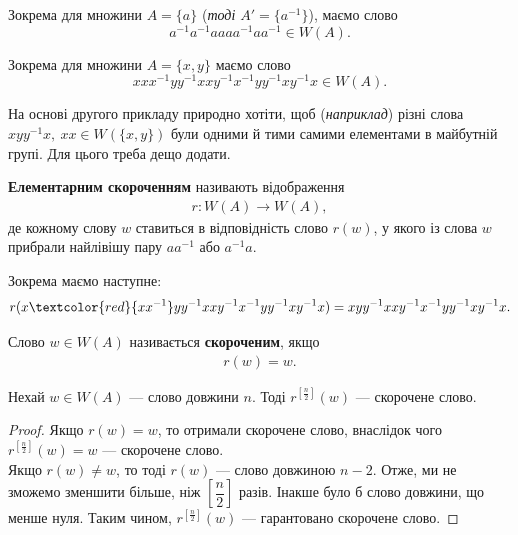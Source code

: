 \documentclass{math_library}
\begin{document}
\begin{example}
Зокрема для множини $A = \{a\}$ (\textit{тоді $A' = \{a^{-1}\}$}), маємо слово 
\[
a^{-1}a^{-1}aaaa^{-1}aa^{-1} \in W(A).
\]
\end{example}

\begin{example}
Зокрема для множини $A = \{x,y\}$ маємо слово 
\[
xxx^{-1}yy^{-1}xxy^{-1}x^{-1}yy^{-1}xy^{-1}x \in W(A).
\]
\end{example}

На основі другого прикладу природно хотіти, щоб (\textit{наприклад}) різні слова $xyy^{-1}x,\ xx \in W(\{x,y\})$ були одними й тими самими елементами в майбутній групі. Для цього треба дещо додати.

\begin{definition}
\textbf{Елементарним скороченням} називають відображення
\begin{align*}
r \colon W(A) \to W(A),
\end{align*}
де кожному слову $w$ ставиться в відповідність слово $r(w)$, у якого із слова $w$ прибрали найлівішу пару $aa^{-1}$ або $a^{-1}a$.
\end{definition}

\begin{example}
Зокрема маємо наступне:
\[
r(x\textcolor{red}{xx^{-1}}yy^{-1}xxy^{-1}x^{-1}yy^{-1}xy^{-1}x) = xyy^{-1}xxy^{-1}x^{-1}yy^{-1}xy^{-1}x.
\]
\end{example}

\begin{definition}
Слово $w \in W(A)$ називається \textbf{скороченим}, якщо
\begin{align*}
r(w) = w.
\end{align*}
\end{definition}

\begin{lemma}
Нехай $w \in W(A)$ --- слово довжини $n$. Тоді $r^{\left[ \frac{n}{2} \right]}(w)$ --- скорочене слово.
\end{lemma}

\begin{proof}
Якщо $r(w) = w$, то отримали скорочене слово, внаслідок чого $r^{\left[ \frac{n}{2} \right]}(w) = w$ --- скорочене слово.\\
Якщо $r(w) \neq w$, то тоді $r(w)$ --- слово довжиною $n-2$. Отже, ми не зможемо зменшити більше, ніж $\left[ \dfrac{n}{2} \right]$ разів. Інакше було б слово довжини, що менше нуля. Таким чином, $r^{\left[ \frac{n}{2} \right]}(w)$ --- гарантовано скорочене слово.
\end{proof}
\end{document}
